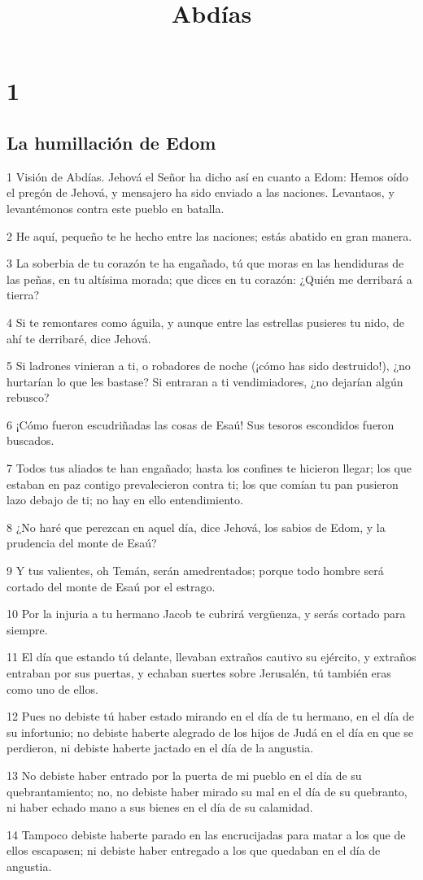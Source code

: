 

\title{Abdías}

\chapter{1}

\section*{La humillación de Edom}

\par 1 Visión de Abdías. Jehová el Señor ha dicho así en cuanto a Edom: Hemos oído el pregón de Jehová, y mensajero ha sido enviado a las naciones. Levantaos, y levantémonos contra este pueblo en batalla.
\par 2 He aquí, pequeño te he hecho entre las naciones; estás abatido en gran manera.
\par 3 La soberbia de tu corazón te ha engañado, tú que moras en las hendiduras de las peñas, en tu altísima morada; que dices en tu corazón: ¿Quién me derribará a tierra?
\par 4 Si te remontares como águila, y aunque entre las estrellas pusieres tu nido, de ahí te derribaré, dice Jehová.
\par 5 Si ladrones vinieran a ti, o robadores de noche (¡cómo has sido destruido!), ¿no hurtarían lo que les bastase? Si entraran a ti vendimiadores, ¿no dejarían algún rebusco?
\par 6 ¡Cómo fueron escudriñadas las cosas de Esaú! Sus tesoros escondidos fueron buscados.
\par 7 Todos tus aliados te han engañado; hasta los confines te hicieron llegar; los que estaban en paz contigo prevalecieron contra ti; los que comían tu pan pusieron lazo debajo de ti; no hay en ello entendimiento.
\par 8 ¿No haré que perezcan en aquel día, dice Jehová, los sabios de Edom, y la prudencia del monte de Esaú?
\par 9 Y tus valientes, oh Temán, serán amedrentados; porque todo hombre será cortado del monte de Esaú por el estrago.
\par 10 Por la injuria a tu hermano Jacob te cubrirá vergüenza, y serás cortado para siempre.
\par 11 El día que estando tú delante, llevaban extraños cautivo su ejército, y extraños entraban por sus puertas, y echaban suertes sobre Jerusalén, tú también eras como uno de ellos.
\par 12 Pues no debiste tú haber estado mirando en el día de tu hermano, en el día de su infortunio; no debiste haberte alegrado de los hijos de Judá en el día en que se perdieron, ni debiste haberte jactado en el día de la angustia.
\par 13 No debiste haber entrado por la puerta de mi pueblo en el día de su quebrantamiento; no, no debiste haber mirado su mal en el día de su quebranto, ni haber echado mano a sus bienes en el día de su calamidad.
\par 14 Tampoco debiste haberte parado en las encrucijadas para matar a los que de ellos escapasen; ni debiste haber entregado a los que quedaban en el día de angustia.

